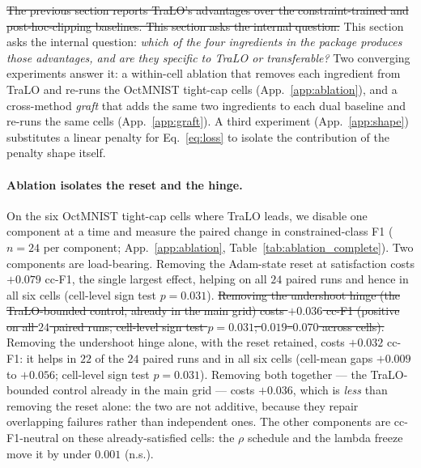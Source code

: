 \documentclass[10pt]{article}
\newcommand{\del}[1]{{\color{red}\sout{#1}}}
\begin{document}
\del{The previous section reports TraLO's advantages over the constraint-trained
and post-hoc-clipping baselines. This section asks the internal question:}%
{\color{blue}This section asks the internal question:}
\emph{which of the four ingredients in the package produces those
advantages, and are they specific to TraLO or transferable?} Two
converging experiments answer it: a within-cell ablation that removes each
ingredient from TraLO and re-runs the OctMNIST tight-cap cells
(App.~\ref{app:ablation}), and a cross-method \emph{graft} that adds the
same two ingredients to each dual baseline and re-runs the same cells
(App.~\ref{app:graft}). A third experiment (App.~\ref{app:shape})
substitutes a linear penalty for Eq.~\eqref{eq:loss} to isolate the
contribution of the penalty shape itself.

\paragraph{Ablation isolates the reset and the hinge.}
On the six OctMNIST tight-cap cells where TraLO leads, we disable one
component at a time and measure the paired change in constrained-class F1
($n{=}24$ per component; {\color{blue}App.~\ref{app:ablation}, }Table~\ref{tab:ablation_complete}). Two
components are load-bearing. Removing the Adam-state reset at satisfaction
costs $+0.079$ cc-F1, the single largest effect, helping on all $24$
paired runs and hence in all six cells (cell-level sign test $p\!=\!0.031$).
\del{Removing the undershoot hinge (the TraLO-bounded control, already in the
main grid) costs \mbox{$+0.036$} cc-F1 (positive on all \mbox{$24$} paired runs;
cell-level sign test \mbox{$p\!=\!0.031$}; \mbox{$0.019$--$0.070$} across cells).}
{\color{blue}Removing the undershoot hinge alone, with the reset retained, costs
$+0.032$ cc-F1: it helps in $22$ of the $24$ paired runs and in all six cells
(cell-mean gaps $+0.009$ to $+0.056$; cell-level sign test $p\!=\!0.031$). Removing
both together --- the TraLO-bounded control already in the main grid --- costs
$+0.036$, which is \emph{less} than removing the reset alone: the two are not
additive, because they repair overlapping failures rather than independent ones.}
The other components are cc-F1-neutral on these already-satisfied cells: the
$\rho$ schedule and the lambda freeze move it by under $0.001$ (n.s.).
\end{document}
